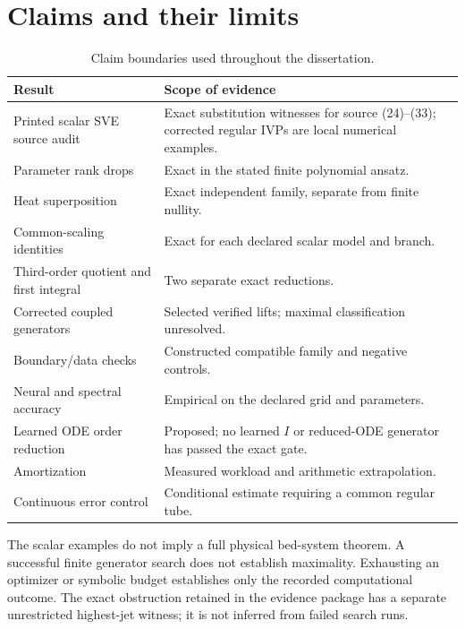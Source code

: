 \documentclass[12pt,a4paper,oneside]{report}
\numberwithin{equation}{chapter}
\begin{document}
\section{Claims and their limits}
\begin{table}[htbp]
\centering\small
\begin{tabular}{p{}p{}}
\toprule
Result & Scope of evidence\\\midrule
Printed scalar SVE source audit & Exact substitution witnesses for source (24)--(33); corrected regular IVPs are local numerical examples.\\
Parameter rank drops & Exact in the stated finite polynomial ansatz.\\
Heat superposition & Exact independent family, separate from finite nullity.\\
Common-scaling identities & Exact for each declared scalar model and branch.\\
Third-order quotient and first integral & Two separate exact reductions.\\
Corrected coupled generators & Selected verified lifts; maximal classification unresolved.\\
Boundary/data checks & Constructed compatible family and negative controls.\\
Neural and spectral accuracy & Empirical on the declared grid and parameters.\\
Learned ODE order reduction & Proposed; no learned $I$ or reduced-ODE generator has passed the exact gate.\\
Amortization & Measured workload and arithmetic extrapolation.\\
Continuous error control & Conditional estimate requiring a common regular tube.\\
\bottomrule
\end{tabular}
\caption{Claim boundaries used throughout the dissertation.}
\label{tab:claims}
\end{table}
The scalar examples do not imply a full physical bed-system theorem. A
successful finite generator search does not establish maximality. Exhausting
an optimizer or symbolic budget establishes only the recorded computational
outcome. The exact obstruction retained in the evidence package has a separate
unrestricted highest-jet witness; it is not inferred from failed search runs.
\end{document}
